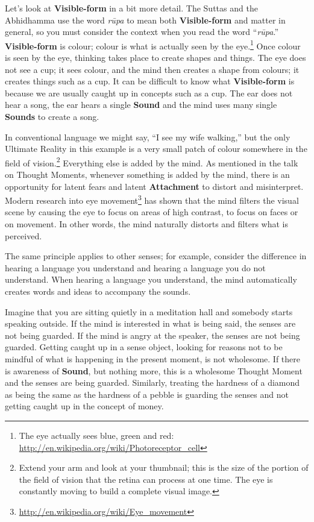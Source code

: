 Let’s look at \textbf{Visible-form} in a bit more detail. The Suttas and the Abhidhamma use the word \textit{rūpa} to mean both \textbf{Visible-form} and matter in general, so you must consider the context when you read the word “\textit{rūpa}.” \textbf{Visible-form} is colour; colour is what is actually seen by the eye.\footnote{The eye actually sees blue, green and red: \url{http://en.wikipedia.org/wiki/Photoreceptor_cell}} Once colour is seen by the eye, thinking takes place to create shapes and things. The eye does not see a cup; it sees colour, and the mind then creates a shape from colours; it creates things such as a cup. It can be difficult to know what \textbf{Visible-form} is because we are usually caught up in concepts such as a cup. The ear does not hear a song, the ear hears a single \textbf{Sound} and the mind uses many single \textbf{Sounds} to create a song.

In conventional language we might say, “I see my wife walking,” but the only Ultimate Reality in this example is a very small patch of colour somewhere in the field of vision.\footnote{Extend your arm and look at your thumbnail; this is the size of the portion of the field of vision that the retina can process at one time. The eye is constantly moving to build a complete visual image.} Everything else is added by the mind. As mentioned in the talk on Thought Moments, whenever something is added by the mind, there is an opportunity for latent fears and latent \textbf{Attachment} to distort and misinterpret. Modern research into eye movement\footnote{\url{http://en.wikipedia.org/wiki/Eye_movement}} has shown that the mind filters the visual scene by causing the eye to focus on areas of high contrast, to focus on faces or on movement. In other words, the mind naturally distorts and filters what is perceived.

The same principle applies to other senses; for example, consider the difference in hearing a language you understand and hearing a language you do not understand. When hearing a language you understand, the mind automatically creates words and ideas to accompany the sounds.

Imagine that you are sitting quietly in a meditation hall and somebody starts speaking outside. If the mind is interested in what is being said, the senses are not being guarded. If the mind is angry at the speaker, the senses are not being guarded. Getting caught up in a sense object, looking for reasons not to be mindful of what is happening in the present moment, is not wholesome. If there is awareness of \textbf{Sound}, but nothing more, this is a wholesome Thought Moment and the senses are being guarded. Similarly, treating the hardness of a diamond as being the same as the hardness of a pebble is guarding the senses and not getting caught up in the concept of money.

